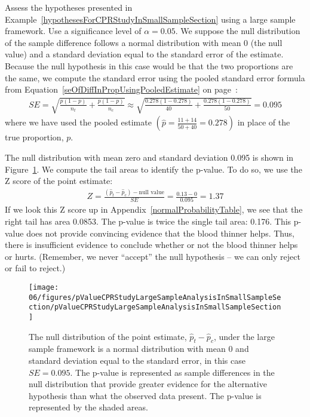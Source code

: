 \begin{example}{Assess the hypotheses presented in Example~\ref{hypothesesForCPRStudyInSmallSampleSection} using a large sample framework. Use a significance level of $\alpha=0.05$.}
We suppose the null distribution of the sample difference follows a normal distribution with mean 0 (the null value) and a standard deviation equal to the standard error of the estimate. Because the null hypothesis in this case would be that the two proportions are the same, we compute the standard error using the pooled standard error formula from Equation~\eqref{seOfDiffInPropUsingPooledEstimate} on page~\pageref{seOfDiffInPropUsingPooledEstimate}:
\begin{align*}
SE = \sqrt{\frac{p(1-p)}{n_t} + \frac{p(1-p)}{n_c}}
	\approx \sqrt{\frac{0.278(1-0.278)}{40} + \frac{0.278(1-0.278)}{50}} = 0.095
\end{align*}
where we have used the pooled estimate $\left( \hat{p} = \frac{11+14}{50 + 40} = 0.278 \right)$ in place of the true proportion, $p$.

The null distribution with mean zero and standard deviation 0.095 is shown in Figure~\ref{pValueCPRStudyLargeSampleAnalysisInSmallSampleSection}. We compute the tail areas to identify the p-value. To do so, we use the Z score of the point estimate:
\begin{align*}
Z = \frac{(\hat{p}_t - \hat{p}_c) - \text{null value}}{SE} = \frac{0.13 - 0}{0.095} = 1.37
\end{align*}
If we look this Z score up in Appendix~\ref{normalProbabilityTable}, we see that the right tail has area 0.0853. The p-value is twice the single tail area: 0.176. This p-value does not provide convincing evidence that the blood thinner helps. Thus, there is insufficient evidence to conclude whether or not the blood thinner helps or hurts. (Remember, we never ``accept'' the null hypothesis -- we can only reject or fail to reject.)
\end{example}
\begin{figure}[ht]
\centering
\texttt{[image: 06/figures/pValueCPRStudyLargeSampleAnalysisInSmallSampleSection/pValueCPRStudyLargeSampleAnalysisInSmallSampleSection]}
\caption{The null distribution of the point estimate, $\hat{p}_t - \hat{p}_c$, under the large sample framework is a normal distribution with mean $0$ and standard deviation equal to the standard error, in this case $SE=0.095$. The p-value is represented as sample differences in the null distribution that provide greater evidence for the alternative hypothesis than what the observed data present. The p-value is represented by the shaded areas.}
\label{pValueCPRStudyLargeSampleAnalysisInSmallSampleSection}
\end{figure}

